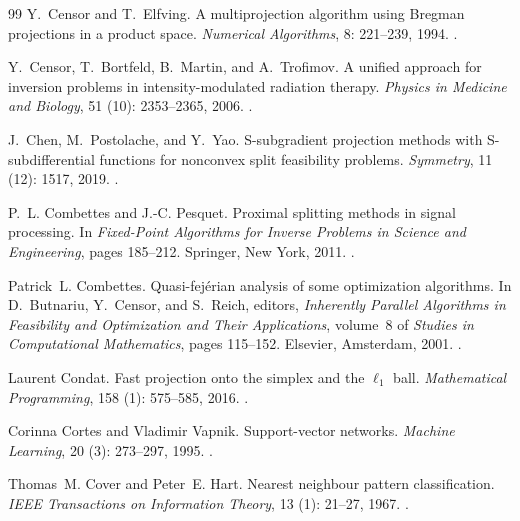 \documentclass[]{interact}
\theoremstyle{plain}
\theoremstyle{definition}
\theoremstyle{remark}
\begin{document}
\begin{thebibliography}{99}
Y.~Censor and T.~Elfving.
\newblock A multiprojection algorithm using {B}regman projections in a product space.
\newblock \emph{Numerical Algorithms}, 8: 221--239, 1994.
\newblock {}.

Y.~Censor, T.~Bortfeld, B.~Martin, and A.~Trofimov.
\newblock A unified approach for inversion problems in intensity-modulated radiation therapy.
\newblock \emph{Physics in Medicine and Biology}, 51 (10): 2353--2365, 2006.
\newblock {}.

J.~Chen, M.~Postolache, and Y.~Yao.
\newblock S-subgradient projection methods with S-subdifferential functions for nonconvex split feasibility problems.
\newblock \emph{Symmetry}, 11 (12): 1517, 2019.
\newblock {}.

P.~L. Combettes and J.-C. Pesquet.
\newblock Proximal splitting methods in signal processing.
\newblock In \emph{Fixed-Point Algorithms for Inverse Problems in Science and Engineering}, pages 185--212. Springer, New York, 2011.
\newblock {}.

Patrick~L. Combettes.
\newblock Quasi-fej{\'e}rian analysis of some optimization algorithms.
\newblock In D.~Butnariu, Y.~Censor, and S.~Reich, editors, \emph{Inherently Parallel Algorithms in Feasibility and Optimization and Their Applications}, volume~8 of \emph{Studies in Computational Mathematics}, pages 115--152. Elsevier, Amsterdam, 2001.
\newblock {}.

Laurent Condat.
\newblock Fast projection onto the simplex and the $\ell_1$ ball.
\newblock \emph{Mathematical Programming}, 158 (1): 575--585, 2016.
\newblock {}.

Corinna Cortes and Vladimir Vapnik.
\newblock Support-vector networks.
\newblock \emph{Machine Learning}, 20 (3): 273--297, 1995.
\newblock {}.

Thomas~M. Cover and Peter~E. Hart.
\newblock Nearest neighbour pattern classification.
\newblock \emph{IEEE Transactions on Information Theory}, 13 (1): 21--27, 1967.
\newblock {}.


\end{thebibliography}
\end{document}
